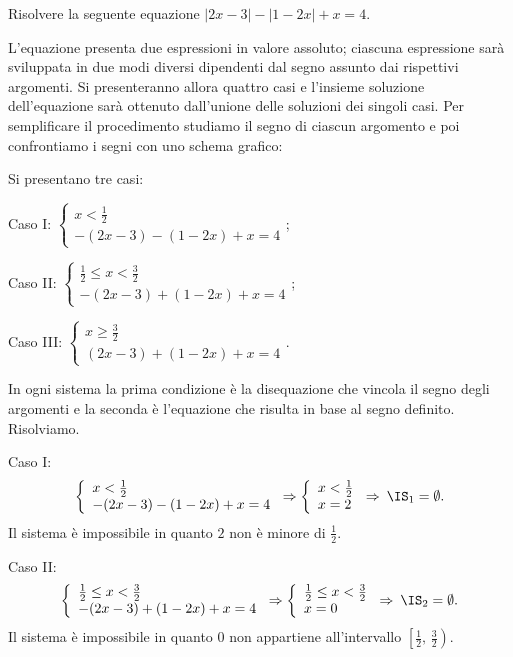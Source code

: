 \begin{exrig}
\begin{esempio}
Risolvere la seguente equazione $\left|2x-3\right|-\left|1-2x\right|+x=4$.

L'equazione presenta due espressioni in valore assoluto; ciascuna espressione sarà sviluppata in due modi diversi dipendenti dal segno assunto dai rispettivi argomenti. Si presenteranno allora quattro casi e l'insieme soluzione dell'equazione sarà ottenuto dall'unione delle soluzioni dei singoli casi. Per semplificare il procedimento studiamo il segno di ciascun argomento e poi confrontiamo i segni con uno schema grafico:
\begin{center}

\end{center}
Si presentano tre casi:
\begin{itemize*}
\item Caso I: $ \left\{\begin{array}{l}{x< \frac 1 2}\\{-(2x-3)-(1-2x)+x=4}\end{array}\right. $;
\item Caso II: $ \left\{\begin{array}{l}{\frac 1 2\le x<\frac 3 2}\\{-(2x-3)+(1-2x)+x=4}\end{array}\right. $;
\item Caso III: $ \left\{\begin{array}{l}{x\ge \frac 3 2}\\{(2x-3)+(1-2x)+x=4}\end{array}\right. $.
\end{itemize*}
In ogni sistema la prima condizione è la disequazione che vincola il segno degli argomenti e la seconda è l'equazione che risulta in base al segno definito. Risolviamo.

Caso I:
\[\left\{\begin{array}{l}x< \frac 1 2\\-(2x-3)-(1-2x)+x=4\end{array}\right.\Rightarrow \left\{\begin{array}{l}x< \frac 1 2\\x=2\end{array}\right.\Rightarrow\: \IS_1=\emptyset .\]
Il sistema è impossibile in quanto $2$ non è minore di $\frac 1 2$.

Caso II: 
\[\left\{\begin{array}{l}\frac 1 2\le x< \frac 3 2\\-(2x-3)+(1-2x)+x=4\end{array}\right.\Rightarrow \left\{\begin{array}{l}\frac 1 2\le x< \frac 3 2\\x=0\end{array}\right.\Rightarrow\: \IS_2=\emptyset .\]
Il sistema è impossibile in quanto 0 non appartiene all'intervallo $\left[\frac{1}{2}\text{, }\frac{3}{2}\right)$.


\end{esempio}
\end{exrig}
